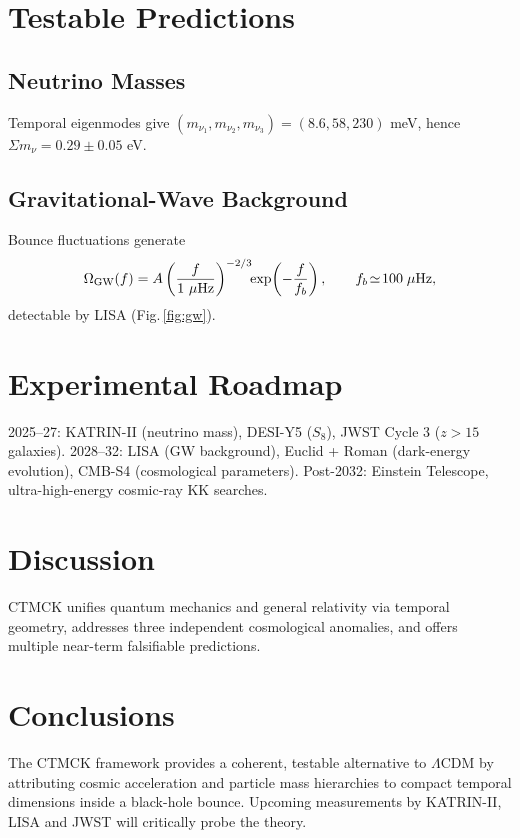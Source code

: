 \documentclass[reprint,amsmath,amssymb,aps,prd,nofootinbib,longbibliography]{revtex4-2}
\begin{document}
\section{Testable Predictions}\label{sec:predictions}
\subsection{Neutrino Masses}
Temporal eigenmodes give $(m_{\nu_1},m_{\nu_2},m_{\nu_3})=(8.6,58,230)$ meV, hence $\Sigma m_\nu=0.29\pm0.05$ eV.
\subsection{Gravitational-Wave Background}
Bounce fluctuations generate
\begin{equation}
\Omega_{\mathrm{GW}}(f)=A\left(\frac{f}{1\ \mu{\rm Hz}}\right)^{-2/3}\!\!\exp\!\left(-\frac{f}{f_b}\right),\qquad f_b\!\simeq\!100\;\mu{\rm Hz},
\end{equation}
detectable by \textsc{LISA} (Fig.\,\ref{fig:gw}).

\section{Experimental Roadmap}\label{sec:roadmap}
2025–27: KATRIN-II (neutrino mass), DESI-Y5 ($S_8$), JWST Cycle 3 ($z>15$ galaxies).  
2028–32: \textsc{LISA} (GW background), Euclid + Roman (dark-energy evolution), CMB-S4 (cosmological parameters).  
Post-2032: Einstein Telescope, ultra-high-energy cosmic-ray KK searches.

\section{Discussion}\label{sec:discussion}
CTMCK unifies quantum mechanics and general relativity via temporal geometry, addresses three independent cosmological anomalies, and offers multiple near-term falsifiable predictions.

\section{Conclusions}\label{sec:conclusions}
The CTMCK framework provides a coherent, testable alternative to $\Lambda$CDM by attributing cosmic acceleration and particle mass hierarchies to compact temporal dimensions inside a black-hole bounce. Upcoming measurements by KATRIN-II, \textsc{LISA} and JWST will critically probe the theory.
\end{document}
